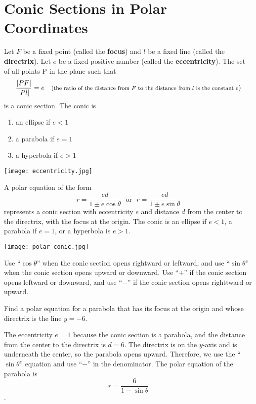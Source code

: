 \section{Conic Sections in Polar Coordinates}
  \begin{theorem}
    Let $F$ be a fixed point (called the \textbf{focus}) and $l$ be a fixed line  (called the \textbf{directrix}). Let $e$ be a fixed positive number (called the \textbf{eccentricity}). The set of all points P in the plane such that
    $$\frac{|PF|}{|Pl|}=e \ \ \ \text{\footnotesize(the ratio of the distance from $F$ to the distance from $l$ is the constant e})$$
    is a conic section. The conic is
    \begin{enumerate}
      \item an ellipse if $e<1$
      \item a parabola if $e=1$
      \item a hyperbola if $e>1$
    \end{enumerate}
  \end{theorem}
  \begin{center}
      \texttt{[image: eccentricity.jpg]}
    \end{center}
  \begin{theorem}
    A polar equation of the form
    $$r=\frac{ed}{1\pm e\cos\theta}\ \ \ \text{or}\ \ \ r=\frac{ed}{1\pm e\sin\theta}$$
    represents a conic section with eccentricity $e$ and distance $d$ from the center to the directrix, with the focus at the origin. The conic is an ellipse if $e<1$, a parabola if $e=1$, or a hyperbola is $e>1$.
  \end{theorem}
  \begin{center}
      \texttt{[image: polar\_conic.jpg]}
  \end{center}
   Use ``$\cos\theta$'' when the conic section opens rightward or leftward, and use ``$\sin\theta$'' when the conic section opens upward or downward. Use ``$+$'' if the conic section opens leftward or downward, and use ``$-$'' if the conic section opens righttward or upward.
  \begin{example}
    Find a polar equation for a parabola that has its focus at the origin and whose directrix is the line $y=-6$.
  \end{example}
  \begin{solution}
    The eccentricity $e=1$ because the conic section is a parabola, and the distance from the center to the directrix is $d=6$. The directrix is on the $y$-axis and is underneath the center, so the parabola opens upward. Therefore, we use the ``$\sin\theta$'' equation and use ``$-$'' in the denominator. The polar equation of the parabola is $$r=\frac{6}{1-\sin\theta}$$.
  \end{solution}
